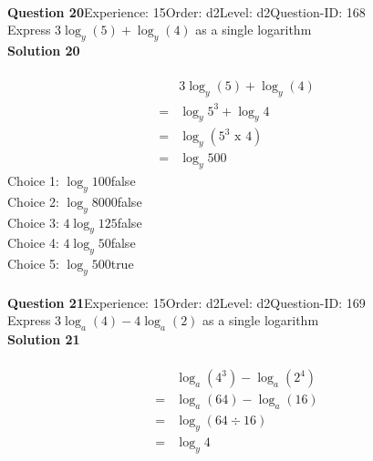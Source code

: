 \documentclass{article}
\begin{document}
\\[4pt]
\noindent\textbf{Question 20}\hspace{20pt}Experience: 15\hspace{20pt}Order: d2\hspace{20pt}Level: d2\hspace{20pt}Question-ID: 168\\[2pt]
Express $3\log_{y}(5)+\log_{y}(4)$ as a single logarithm\\[4pt]
\noindent\textbf{Solution 20}\\[2pt]
\\[-35pt]\begin{align*}
&3\log_{y}(5)+\log_{y}(4)\\[2pt]
=&\log_{y}5^3+\log_{y}4\\[2pt]
=&\log_{y}(5^3 \,\, \text{x} \,\, 4)\\[2pt]
=&\log_{y}500
\end{align*}
Choice 1: \hspace{20pt}$\log_{y}100$\hspace{20pt}false\\
Choice 2: \hspace{20pt}$\log_{y}8000$\hspace{20pt}false\\
Choice 3: \hspace{20pt}$4\log_{y}125$\hspace{20pt}false\\
Choice 4: \hspace{20pt}$4\log_{y}50$\hspace{20pt}false\\
Choice 5: \hspace{20pt}$\log_{y}500$\hspace{20pt}true\\
\\[4pt]
\noindent\textbf{Question 21}\hspace{20pt}Experience: 15\hspace{20pt}Order: d2\hspace{20pt}Level: d2\hspace{20pt}Question-ID: 169\\[2pt]
Express $3\log_{a}(4)-4\log_{a}(2)$ as a single logarithm\\[4pt]
\noindent\textbf{Solution 21}\\[2pt]
\\[-35pt]\begin{align*}
&\log_{a}(4^3)-\log_{a}(2^4)\\[2pt]
=&\log_{a}(64)-\log_{a}(16)\\[2pt]
=&\log_{y}(64 \div 16)\\[2pt]
=&\log_{y}4
\end{align*}
\end{document}
